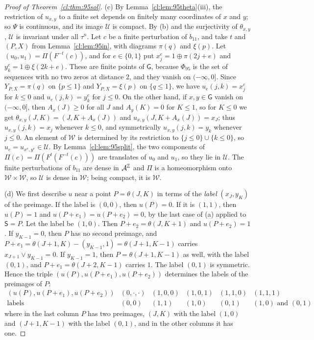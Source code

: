 \begin{proof}[Proof of Theorem~\ref{cl:thm:95sol}]
(c) By Lemma~\ref{cl:lem:95theta}(iii), the restriction of $u_{x,y}$ to a finite set depends on finitely many coordinates of $x$ and $y$; so $\Psi$ is continuous, and its image $\mathcal U$ is compact. By (b) and the surjectivity of $\theta_{x,y}$, $\mathcal U$ is invariant under all $\tau^n$. Let $c$ be a finite perturbation of $b_{11}$, and take $t$ and $(P,X)$ from Lemma~\ref{cl:lem:95in}, with diagrams $\pi(q)$ and $\xi(p)$. Let $(u_0,u_1)=\Pi(F^{-t}(c))$, and for $e\in\{0,1\}$ put $x^e_j=1\oplus\pi(2j+e)$ and $y^e_k=1\oplus\xi(2k+e)$. These are finite points of $\mathsf G$, because $\Phi_{95}$ is the set of sequences with no two zeros at distance $2$, and they vanish on $(-\infty,0]$. Since $Y_{P,X}=\pi(q)$ on $\{p\le1\}$ and $Y_{P,X}=\xi(p)$ on $\{q\le1\}$, we have $u_e(j,k)=x^e_j$ for $k\le0$ and $u_e(j,k)=y^e_k$ for $j\le0$. On the other hand, if $x,y\in \mathsf G$ vanish on $(-\infty,0]$, then $A_x(J)\ge0$ for all $J$ and $A_y(K)=0$ for $K\le1$, so for $K\le0$ we get $\theta_{x,y}(J,K)=(J,K+A_x(J))$ and $u_{x,y}(J,K+A_x(J))=x_J$; thus $u_{x,y}(j,k)=x_j$ whenever $k\le0$, and symmetrically $u_{x,y}(j,k)=y_k$ whenever $j\le0$. An element of $\mathcal W$ is determined by its restriction to $\{j\le0\}\cup\{k\le0\}$, so $u_e=u_{x^e,y^e}\in\mathcal U$. By Lemma~\ref{cl:lem:95split}, the two components of $\Pi(c)=\Pi(F^t(F^{-t}(c)))$ are translates of $u_0$ and $u_1$, so they lie in $\mathcal U$. The finite perturbations of $b_{11}$ are dense in $\mathcal{A}^{\mathbb{Z}}$ and $\Pi$ is a homeomorphism onto $\mathcal W\times\mathcal W$, so $\mathcal U$ is dense in $\mathcal W$; being compact, it is $\mathcal W$.

(d) We first describe $u$ near a point $P=\theta(J,K)$ in terms of the \emph{label} $(x_J,y_K)$ of the preimage. If the label is $(0,0)$, then $u(P)=0$. If it is $(1,1)$, then $u(P)=1$ and $u(P+e_1)=u(P+e_2)=0$, by the last case of (a) applied to $\mathsf S=P$. Let the label be $(1,0)$. Then $P+e_2=\theta(J,K+1)$ and $u(P+e_2)=1$. If $y_{K-1}=0$, then $P$ has no second preimage, and $P+e_1=\theta(J+1,K)-(y_{K-1},1)=\theta(J+1,K-1)$ carries $x_{J+1}\vee y_{K-1}=0$. If $y_{K-1}=1$, then $P=\theta(J+1,K-1)$ as well, with the label $(0,1)$, and $P+e_1=\theta(J+2,K-1)$ carries $1$. The label $(0,1)$ is symmetric. Hence the triple $(u(P),u(P+e_1),u(P+e_2))$ determines the labels of the preimages of $P$:
\begin{equation}\label{cl:eq:types}
\begin{array}{c|ccccc}
(u(P),u(P+e_1),u(P+e_2))&(0,\cdot,\cdot)&(1,0,0)&(1,0,1)&(1,1,0)&(1,1,1)\\\hline
\text{labels}&(0,0)&(1,1)&(1,0)&(0,1)&(1,0)\text{ and }(0,1)
\end{array}
\end{equation}
where in the last column $P$ has two preimages, $(J,K)$ with the label $(1,0)$ and $(J+1,K-1)$ with the label $(0,1)$, and in the other columns it has one.


\end{proof}
